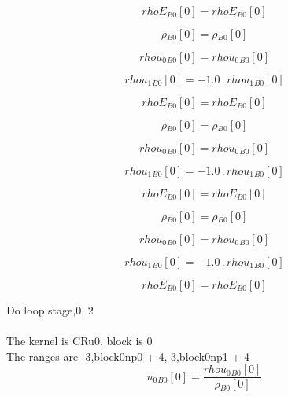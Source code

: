 \documentclass{article}
\begin{document}
\begin{dmath}{rhoE{_{B0}}}[{0}] = {rhoE{_{B0}}}[{0}]\end{dmath}

\begin{dmath}{\rho{_{B0}}}[{0}] = {\rho{_{B0}}}[{0}]\end{dmath}

\begin{dmath}{rhou_{0}{_{B0}}}[{0}] = {rhou_{0}{_{B0}}}[{0}]\end{dmath}

\begin{dmath}{rhou_{1}{_{B0}}}[{0}] = - 1.0 \,.\, {rhou_{1}{_{B0}}}[{0}]\end{dmath}

\begin{dmath}{rhoE{_{B0}}}[{0}] = {rhoE{_{B0}}}[{0}]\end{dmath}

\begin{dmath}{\rho{_{B0}}}[{0}] = {\rho{_{B0}}}[{0}]\end{dmath}

\begin{dmath}{rhou_{0}{_{B0}}}[{0}] = {rhou_{0}{_{B0}}}[{0}]\end{dmath}

\begin{dmath}{rhou_{1}{_{B0}}}[{0}] = - 1.0 \,.\, {rhou_{1}{_{B0}}}[{0}]\end{dmath}

\begin{dmath}{rhoE{_{B0}}}[{0}] = {rhoE{_{B0}}}[{0}]\end{dmath}

\begin{dmath}{\rho{_{B0}}}[{0}] = {\rho{_{B0}}}[{0}]\end{dmath}

\begin{dmath}{rhou_{0}{_{B0}}}[{0}] = {rhou_{0}{_{B0}}}[{0}]\end{dmath}

\begin{dmath}{rhou_{1}{_{B0}}}[{0}] = - 1.0 \,.\, {rhou_{1}{_{B0}}}[{0}]\end{dmath}

\begin{dmath}{rhoE{_{B0}}}[{0}] = {rhoE{_{B0}}}[{0}]\end{dmath}

\noindent Do loop stage,0, 2\\
\\\noindent The kernel is CRu0, block is 0\\\noindent The ranges are -3,block0np0 + 4,-3,block0np1 + 4\\\begin{dmath}{u_{0}{_{B0}}}[{0}] = \frac{{rhou_{0}{_{B0}}}[{0}]}{{\rho{_{B0}}}[{0}]}\end{dmath}
\end{document}
